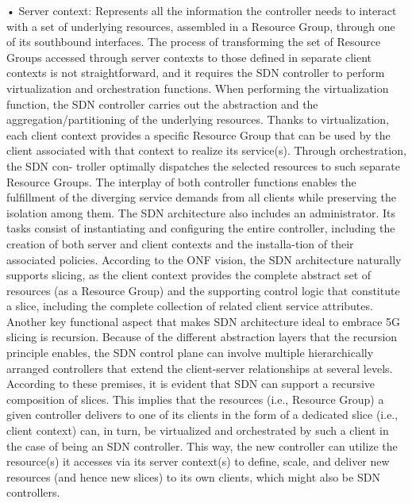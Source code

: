 \documentclass{article}
\begin{document}
• Server context: Represents all the information the controller needs to interact with a set of
underlying resources, assembled in a Resource
Group, through one of its southbound interfaces.
The process of transforming the set of
Resource Groups accessed through server contexts to those defined in separate client contexts
is not straightforward, and it requires the SDN
controller to perform virtualization and orchestration functions.
When performing the virtualization function, the
SDN controller carries out the abstraction and the
aggregation/partitioning of the underlying resources. Thanks to virtualization, each client context provides a specific Resource Group that can be used by the client associated with that context to realize
its service(s). Through orchestration, the SDN con-
troller optimally dispatches the selected resources
to such separate Resource Groups. The interplay
of both controller functions enables the fulfillment
of the diverging service demands from all clients
while preserving the isolation among them.
The SDN architecture also includes an administrator. Its tasks consist of instantiating and configuring the entire controller, including the creation
of both server and client contexts and the installa-tion of their associated policies.
According to the ONF vision, the SDN architecture naturally supports slicing, as the client context provides the complete abstract set of resources
(as a Resource Group) and the supporting control
logic that constitute a slice, including the complete
collection of related client service attributes.
Another key functional aspect that makes SDN
architecture ideal to embrace 5G slicing is recursion. Because of the different abstraction layers
that the recursion principle enables, the SDN
control plane can involve multiple hierarchically
arranged controllers that extend the client-server
relationships at several levels. According to
these premises, it is evident that SDN can support a
recursive composition of slices. This implies that
the resources (i.e., Resource Group) a given controller delivers to one of its clients in the form of a
dedicated slice (i.e., client context) can, in turn, be
virtualized and orchestrated by such a client in the
case of being an SDN controller. This way, the new
controller can utilize the resource(s) it accesses via
its server context(s) to define, scale, and deliver
new resources (and hence new slices) to its own
clients, which might also be SDN controllers.
\end{document}
